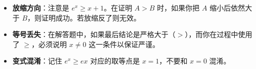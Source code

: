\begin{trapbox}
\begin{itemize}
    \item \textbf{放缩方向}：注意是 $e^x \geqslant x+1$。在证明 $A > B$ 时，如果你把 $A$ 缩小后依然大于 $B$，则证明成功。若放缩反了则无效。
    \item \textbf{等号丢失}：在解答题中，如果最后结论是严格大于（$>$），而你在过程中使用了 $\geqslant$，必须说明 $x \neq 0$ 这一条件以保证严谨。
    \item \textbf{变式混淆}：记住 $e^x \geqslant ex$ 对应的取等点是 $x=1$，不要和 $x=0$ 混淆。
\end{itemize}
\end{trapbox}